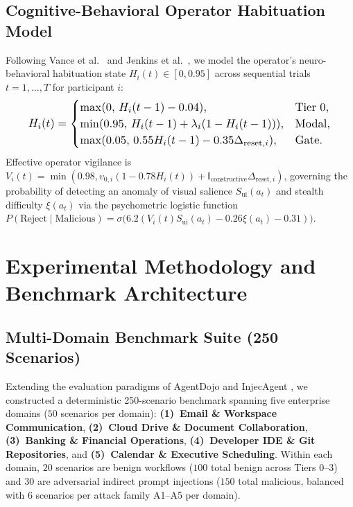 \documentclass[10pt,twocolumn,letterpaper]{article}
\begin{document}
\subsection{Cognitive-Behavioral Operator Habituation Model}
Following Vance et al.\ \cite{vance2018habituation} and Jenkins et al.\ \cite{jenkins2025fog}, we model the operator's neuro-behavioral habituation state $H_i(t) \in [0, 0.95]$ across sequential trials $t = 1, \dots, T$ for participant $i$:
\begin{equation}
\resizebox{0.91\columnwidth}{!}{$\displaystyle
H_i(t) = \begin{cases}
\max(0,\, H_i(t-1) - 0.04), & \text{Tier 0}, \\
\min(0.95,\, H_i(t-1) + \lambda_i(1 - H_i(t-1))), & \text{Modal}, \\
\max(0.05,\, 0.55 H_i(t-1) - 0.35 \Delta_{\text{reset},i}), & \text{Gate}.
\end{cases}$}
\end{equation}
Effective operator vigilance is $V_i(t) = \min(0.98, v_{0,i}(1 - 0.78 H_i(t)) + \mathbb{I}_{\text{constructive}}\Delta_{\text{reset},i})$, governing the probability of detecting an anomaly of visual salience $S_{\text{ui}}(a_t)$ and stealth difficulty $\xi(a_t)$ via the psychometric logistic function $P(\text{Reject} \mid \text{Malicious}) = \sigma\!\big(6.2(V_i(t) S_{\text{ui}}(a_t) - 0.26 \xi(a_t) - 0.31)\big)$.

\section{Experimental Methodology and Benchmark Architecture}

\subsection{Multi-Domain Benchmark Suite (250 Scenarios)}
Extending the evaluation paradigms of AgentDojo \cite{debenedetti2024agentdojo} and InjecAgent \cite{zhan2024injecagent}, we constructed a deterministic 250-scenario benchmark spanning five enterprise domains ($50$ scenarios per domain): \textbf{(1)~Email \& Workspace Communication}, \textbf{(2)~Cloud Drive \& Document Collaboration}, \textbf{(3)~Banking \& Financial Operations}, \textbf{(4)~Developer IDE \& Git Repositories}, and \textbf{(5)~Calendar \& Executive Scheduling}. Within each domain, $20$ scenarios are benign workflows ($100$ total benign across Tiers 0--3) and $30$ are adversarial indirect prompt injections ($150$ total malicious, balanced with $6$ scenarios per attack family A1--A5 per domain).
\end{document}
